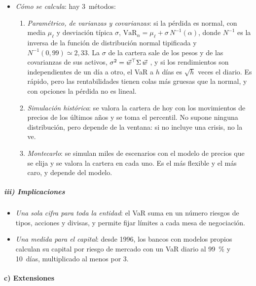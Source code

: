 \documentclass[11pt]{article}
\begin{document}
\begin{itemize}
\item \emph{Cómo se calcula}: hay 3~métodos\nocite{Hull2023Risk}:
  \begin{enumerate}
  \item \emph{Paramétrico, de varianzas y covarianzas}: si la pérdida es normal, con media $\mu_\ell$ y desviación típica $\sigma$, $\mathrm{VaR}_\alpha=\mu_\ell+\sigma\,N^{-1}(\alpha)$, donde $N^{-1}$ es la inversa de la función de distribución normal tipificada y $N^{-1}(0{,}99)\simeq2{,}33$. La $\sigma$ de la cartera sale de los pesos y de las covarianzas de sus activos, $\sigma^2=\vec{w}^{\top}\Sigma\,\vec{w}$ , y si los rendimientos son independientes de un día a otro, el VaR a $h$ días es $\sqrt{h}$ veces el diario. Es rápido, pero las rentabilidades tienen colas más gruesas que la normal, y con opciones la pérdida no es lineal.
  \item \emph{Simulación histórica}: se valora la cartera de hoy con los movimientos de precios de los últimos años y se toma el percentil. No supone ninguna distribución, pero depende de la ventana: si no incluye una crisis, no la ve.
  \item \emph{Montecarlo}: se simulan miles de escenarios con el modelo de precios que se elija y se valora la cartera en cada uno. Es el más flexible y el más caro, y depende del modelo.
  \end{enumerate}
\end{itemize}

\subparagraph{iii) Implicaciones}

\begin{itemize}
\item \emph{Una sola cifra para toda la entidad}: el VaR suma en un número riesgos de tipos, acciones y divisas, y permite fijar límites a cada mesa de negociación.
\item \emph{Una medida para el capital}: desde 1996, los bancos con modelos propios calculan su capital por riesgo de mercado con un VaR diario al 99~\% y 10~días, multiplicado al menos por 3\nocite{BCBS1996MarketRisk}.
\end{itemize}

\paragraph{c) Extensiones}
\end{document}

